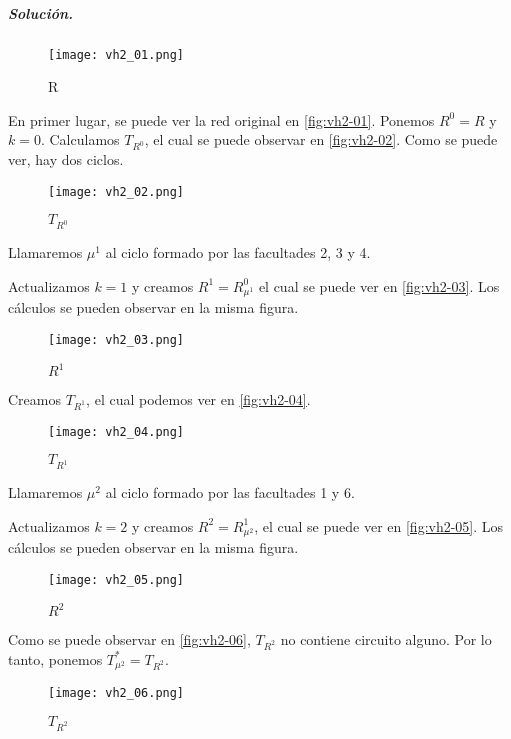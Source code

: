 \documentclass[12pt, oneside, a4paper]{article}
\begin{document}
\subparagraph{Solución.\\}

\begin{figure}
\centering
\texttt{[image: vh2\_01.png]}
\caption{\small R}
\label{fig:vh2-01}
\end{figure}
En primer lugar, se puede ver la red original en \autoref{fig:vh2-01}.
Ponemos $R^0=R$ y $k=0$. Calculamos $T_{R^0}$, el cual se puede
observar en \autoref{fig:vh2-02}. Como se puede ver, hay dos
ciclos.

\begin{figure}
\centering
\texttt{[image: vh2\_02.png]}
\caption{$T_{R^{0}}$}
\label{fig:vh2-02}
\end{figure}

Llamaremos $\mu^1$ al ciclo formado por las facultades 2, 3 y
4.

Actualizamos $k=1$ y creamos $R^1=R^0_{\mu^1}$ el cual se puede ver
en \autoref{fig:vh2-03}. Los cálculos se pueden observar en la misma
figura.

\begin{figure}
\centering
\texttt{[image: vh2\_03.png]}
\caption{$R^{1}$}
\label{fig:vh2-03}
\end{figure}

Creamos $T_{R^{1}}$, el cual podemos ver en \autoref{fig:vh2-04}.

\begin{figure}
\centering
\texttt{[image: vh2\_04.png]}
\caption{$T_{R^{1}}$}
\label{fig:vh2-04}
\end{figure}

Llamaremos $\mu^2$ al ciclo formado por las facultades 1 y 6.

Actualizamos $k=2$ y creamos $R^2=R^1_{\mu^2}$, el cual se puede ver
en \autoref{fig:vh2-05}. Los cálculos se pueden observar en la misma figura.

\begin{figure}
\centering
\texttt{[image: vh2\_05.png]}
\caption{$R^2$}
\label{fig:vh2-05}
\end{figure}

Como se puede observar en \autoref{fig:vh2-06}, $T_{R^{2}}$ no contiene
circuito alguno. Por lo tanto, ponemos $T^{*}_{\mu^{2}}=T_{R^{2}}$.

\begin{figure}
\centering
\texttt{[image: vh2\_06.png]}
\caption{$T_{R^2}$}
\label{fig:vh2-06}
\end{figure}
\end{document}
